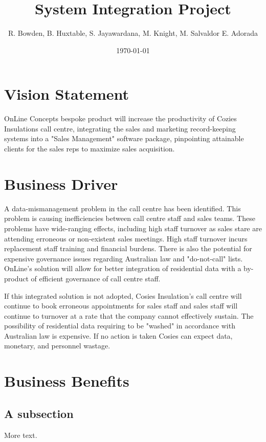 \documentclass[11pt]{article} %
\title{System Integration Project}
\author{R. Bowden, B. Huxtable, S. Jayawardana, M. Knight, M. Salvaldor E. Adorada}
\date{\today}
\begin{document}
\maketitle
\newpage

\tableofcontents       
\newpage


\section{Vision Statement}
\begin{center}
OnLine Concepts bespoke product will increase the productivity of Cozies Insulations call centre, integrating the sales and marketing record-keeping systems into a "Sales Management"
software package, pinpointing attainable clients for the sales reps to maximize sales acquisition.
\end{center}
\section{Business Driver}
\begin{flushleft}
A data-mismanagement problem in the call centre has been identified.  This problem is causing inefficiencies between call centre staff and sales teams.  These problems have wide-ranging effects, including high staff turnover as sales stare are attending erroneous or non-existent sales meetings.  High staff turnover incurs replacement staff training and financial burdens.  There is also the potential for expensive governance issues regarding Australian law and "do-not-call" lists.  OnLine's solution will allow for better integration of residential data with a by-product of efficient governance of call centre staff.
\par
If this integrated solution is not adopted, Cosies Insulation's call centre will continue to book erroneous appointments for sales staff and sales staff will continue to turnover at a rate that the company cannot effectively sustain. The possibility of residential data requiring to be "washed" in accordance with Australian law is expensive.  If no action is taken Cosies can expect data, monetary, and personnel wastage.
\end{flushleft}

\section{Business Benefits}
\subsection{A subsection}

More text.
\end{document}
